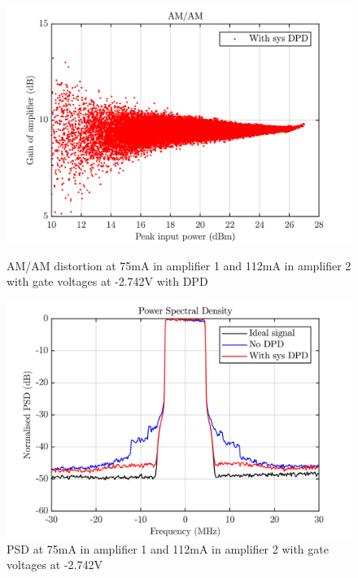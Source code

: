 \begin{figure}[H]
  \centering
  \begin{minipage}[b]{0.5\textwidth}
	\includegraphics[scale = 0.5]{figures/measurement/cree/meas5/amam_sys_dpd_2p742v.png}
	\caption{AM/AM distortion at 75mA in amplifier 1 and 112mA in amplifier 2 with gate voltages at -2.742V with DPD}	
    \label{fig:meas5_5}
  \end{minipage}
  \hfill
  \begin{minipage}[b]{0.4\textwidth}
	\includegraphics[scale = 0.5]{figures/measurement/cree/meas5/psd_2p742v.png}
	\caption{PSD at 75mA in amplifier 1 and 112mA in amplifier 2 with gate voltages at -2.742V}
    \label{fig:meas5_6}
  \end{minipage}
\end{figure}


